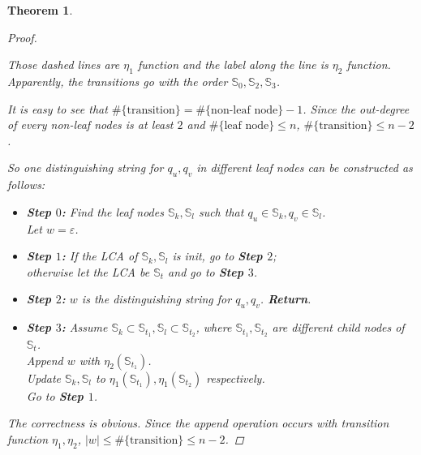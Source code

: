 \documentclass[a4paper]{article}
\newtheorem{theorem}{Theorem}
\newtheorem*{proof}{Proof}
\newcommand{\Sset}{\mathbb{S}}
\begin{document}
\begin{theorem}
\begin{proof}
\begin{center}
    \end{center}
    Those dashed lines are $\eta_1$ function and the label along the line is $\eta_2$ function.
    Apparently, the transitions go with the order $\Sset_0,\Sset_2,\Sset_3$.\par
    It is easy to see that $\#\{\text{transition}\}=\#\{\text{non-leaf node}\}-1$.
    Since the out-degree of every non-leaf nodes is at least $2$ and $\#\{\text{leaf node}\}\leqslant n$,
    $\#\{\text{transition}\}\leqslant n-2$.\par
    So one distinguishing string for $q_u,q_v$ in different leaf nodes can be constructed as follows:
    \begin{itemize}
        \item \textbf{Step $0$:} Find the leaf nodes $\Sset_k,\Sset_l$ such that $q_u\in\Sset_k,q_v\in\Sset_l$.\\
            Let $w=\varepsilon$.
        \item \textbf{Step $1$:} If the LCA of $\Sset_k,\Sset_l$ is \textit{init}, go to \textbf{Step $2$};\\
            otherwise let the LCA be $\Sset_t$ and go to \textbf{Step $3$}. 
        \item \textbf{Step $2$:} $w$ is the distinguishing string for $q_u,q_v$. \textbf{Return}.
        \item \textbf{Step $3$:} Assume $\Sset_k\subset\Sset_{t_1},
            \Sset_l\subset\Sset_{t_2}$, where $\Sset_{t_1},\Sset_{t_2}$ are different child nodes of $\Sset_t$.\\
            Append $w$ with $\eta_2(\Sset_{t_1})$.\\
            Update $\Sset_k,\Sset_l$ to $\eta_1(\Sset_{t_1}),\eta_1(\Sset_{t_2})$ respectively.\\
            Go to \textbf{Step $1$}.
    \end{itemize}
    The correctness is obvious. Since the append operation occurs with transition function $\eta_1,\eta_2$,
    $|w|\leqslant\#\{\text{transition}\}\leqslant n-2$.
    \end{proof}
\end{theorem}
\end{document}
